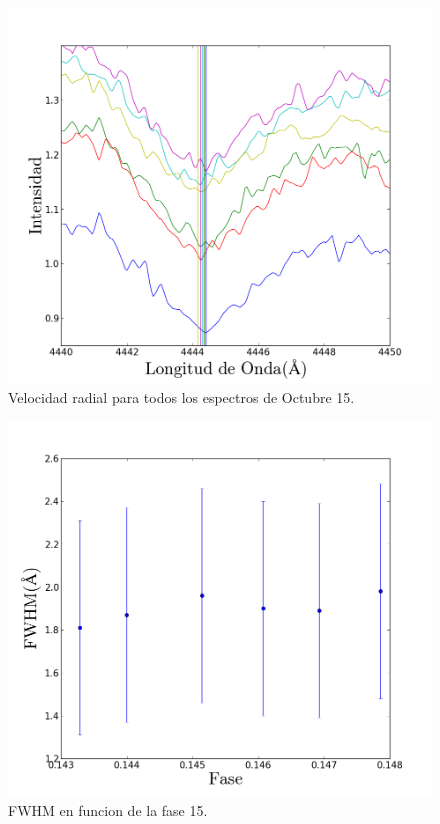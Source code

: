 \documentclass[Proceedings]{ascelike}
\begin{document}
\begin{figure}
\includegraphics[scale=0.5]{epscraEspectra.png}
\caption{Velocidad radial para todos los espectros de Octubre 15. \label{AllSpectra}}
\end{figure}

\begin{figure}
\includegraphics[scale=0.5]{anchovsfase.png}
\caption{FWHM en funcion de la fase 15. \label{FWHM}}
\end{figure}
\end{document}
